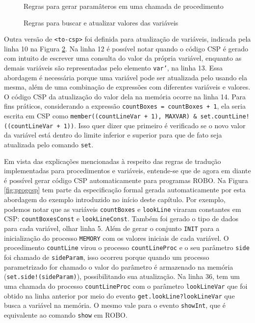 \begin{figure}[h]
\centering
\caption{Regras para gerar paramâteros em uma chamada de procedimento}

\label{fig:rules_param}
\end{figure}

\begin{figure}[h]
\centering
\caption{Regras para buscar e atualizar valores das variáveis}

\label{fig:rules_var}
\end{figure}

Outra versão de \texttt{<to-csp>} foi definida para atualização de variáveis, indicada pela linha 10 na Figura \ref{fig:rules_var}. Na linha 12 é possível notar quando o código CSP é gerado com intuito de escrever uma consulta do valor da própria variável, enquanto as demais variáveis são representadas pelo elemento \texttt{var'}, na linha 13. Essa abordagem é necessária porque uma variável pode ser atualizada pelo usando ela mesma, além de uma combinação de expressões com diferentes variáveis e valores. O código CSP da atualização do valor dela na memória ocorre na linha 14. Para fins práticos, considerando a expressão \texttt{countBoxes = countBoxes + 1}, ela seria escrita em CSP como \texttt{member((countLineVar + 1), MAXVAR) \& set.countLine!((countLineVar + 1))}. Isso quer dizer que primeiro é verificado se o novo valor da variável está dentro do limite inferior e superior para que de fato seja atualizada pelo comando \texttt{set}.

Em vista das explicações mencionadas à respeito das regras de tradução implementadas para procedimentos e variáveis, entende-se que de agora em diante é possível gerar código CSP automaticamente para programas ROBO. Na Figura \ref{fig:progcsp} tem parte da especificação formal gerada automaticamente por esta abordagem do exemplo introduzido no início deste capítulo. Por exemplo, podemos notar que as variáveis \texttt{countBoxes} e \texttt{lookLine} viraram constantes em CSP: \texttt{countBoxesConst} e \texttt{lookLineConst}. Também foi gerado o tipo de dados para cada variável, olhar linha 5. Além de gerar o conjunto \texttt{INIT} para a inicialização do processo \texttt{MEMORY} com os valores iniciais de cada variável. O procedimento \texttt{countLine} virou o processo \texttt{countLineProc} e o seu parâmetro \texttt{side} foi chamado de \texttt{sideParam}, isso ocorreu porque quando um processo parametrizado for chamado o valor do parâmetro é armazenado na memória (\texttt{set.side!(sideParam)}), possibilitando sua atualização. Na linha 36, tem um uma chamada do processo \texttt{countLineProc} com o parâmetro \texttt{lookLineVar} que foi obtido na linha anterior por meio do evento \texttt{get.lookLine?lookLineVar} que busca a variável na memória. O mesmo vale para o evento \texttt{showInt}, que é equivalente ao comando \texttt{show} em ROBO.

